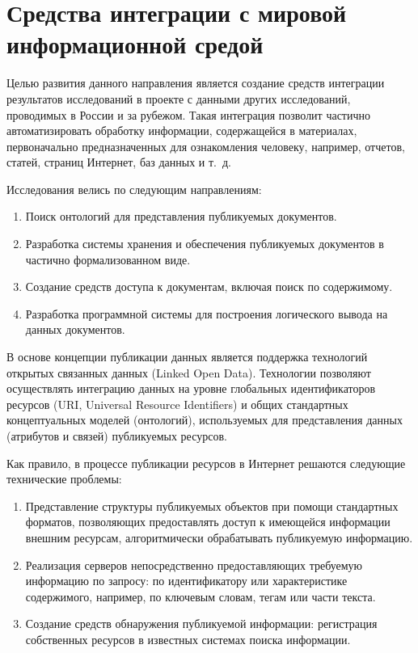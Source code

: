 \documentclass[a4paper,12pt,openany,final]{extreport}
\begin{document}
\chapter{Средства интеграции с мировой информационной средой}\label{chap:7}

Целью развития данного направления является создание средств интеграции результатов исследований в проекте с данными других исследований, проводимых в России и за рубежом. Такая интеграция позволит частично автоматизировать обработку информации, содержащейся в материалах, первоначально предназначенных для ознакомления человеку, например, отчетов, статей, страниц Интернет, баз данных и т.~д.

Исследования велись по следующим направлениям:
\begin{enumerate}
\item Поиск онтологий для представления публикуемых документов.
\item Разработка системы хранения и обеспечения публикуемых документов в частично формализованном виде.
\item Создание средств доступа к документам, включая поиск по содержимому.
\item Разработка программной системы для построения логического вывода на данных документов.
\end{enumerate}

В основе концепции публикации данных является поддержка технологий открытых связанных данных (Linked Open Data). Технологии позволяют осуществлять интеграцию данных на уровне глобальных идентификаторов ресурсов (URI, Universal Resource Identifiers) и общих стандартных концептуальных моделей (онтологий), используемых для представления данных (атрибутов и связей) публикуемых ресурсов.

Как правило, в процессе публикации ресурсов в Интернет решаются следующие технические проблемы:
\begin{enumerate}
\item Представление структуры публикуемых объектов при помощи стандартных форматов, позволяющих предоставлять доступ к имеющейся информации внешним ресурсам, алгоритмически обрабатывать публикуемую информацию.
\item Реализация серверов непосредственно предоставляющих требуемую информацию по запросу: по идентификатору или характеристике содержимого, например, по ключевым словам, тегам или части текста.
\item Создание средств обнаружения публикуемой информации: регистрация собственных ресурсов в известных системах поиска информации.
\end{enumerate}
\end{document}
